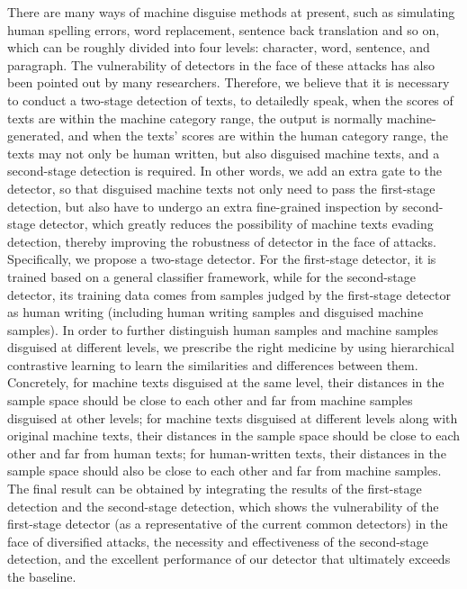 \documentclass[11pt]{article}
\newcommand{\greenCitep}[1]{\textcolor{darkgreen}{\citep{#1}}}
\begin{document}
	There are many ways of machine disguise methods at present, such as simulating human spelling errors, word replacement, sentence back translation and so on, which can be roughly divided into four levels: character, word, sentence, and paragraph\greenCitep{zhou2024navigatingshadows}. The vulnerability of detectors in the face of these attacks has also been pointed out by many researchers\greenCitep{dugan2024raid,krishna2024paraphrasing}. Therefore, we believe that it is necessary to conduct a two-stage detection of texts, to detailedly speak, when the scores of texts are within the machine category range, the output is normally machine-generated, and when the texts' scores are within the human category range, the texts may not only be human written, but also disguised machine texts, and a second-stage detection is required. In other words, we add an extra gate to the detector, so that disguised machine texts not only need to pass the first-stage detection, but also have to undergo an extra fine-grained inspection by second-stage detector, which greatly reduces the possibility of machine texts evading detection, thereby improving the robustness of detector in the face of attacks.\\
	Specifically, we propose a two-stage detector. For the first-stage detector, it is trained based on a general classifier framework, while for the second-stage detector, its training data comes from samples judged by the first-stage detector as human writing (including human writing samples and disguised machine samples). In order to further distinguish human samples and machine samples disguised at different levels, we prescribe the right medicine by using hierarchical contrastive learning to learn the similarities and differences between them. Concretely, for machine texts disguised at the same level, their distances in the sample space should be close to each other and far from machine samples disguised at other levels; for machine texts disguised at different levels along with original machine texts, their distances in the sample space should be close to each other and far from human texts; for human-written texts, their distances in the sample space should also be close to each other and far from machine samples. The final result can be obtained by integrating the results of the first-stage detection and the second-stage detection, which shows the vulnerability of the first-stage detector (as a representative of the current common detectors) in the face of diversified attacks, the necessity and effectiveness of the second-stage detection, and the excellent performance of our detector that ultimately exceeds the baseline.
	
\end{document}

